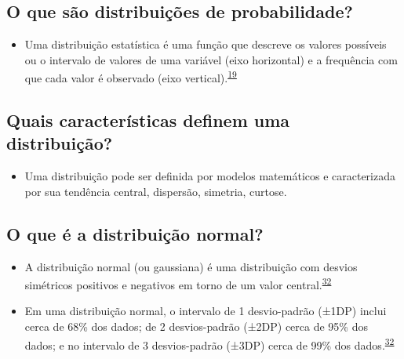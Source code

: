 \documentclass[
]{book}
\providecommand{\tightlist}{%
  \setlength{\itemsep}{0pt}\setlength{\parskip}{0pt}}
\begin{document}
\hypertarget{o-que-suxe3o-distribuiuxe7uxf5es-de-probabilidade}{%
\subsection{O que são distribuições de probabilidade?}\label{o-que-suxe3o-distribuiuxe7uxf5es-de-probabilidade}}

\begin{itemize}
\tightlist
\item
  Uma distribuição estatística é uma função que descreve os valores possíveis ou o intervalo de valores de uma variável (eixo horizontal) e a frequência com que cada valor é observado (eixo vertical).\textsuperscript{\protect\hyperlink{ref-vetter2017}{19}}
\end{itemize}

\hypertarget{quais-caracteruxedsticas-definem-uma-distribuiuxe7uxe3o}{%
\subsection{Quais características definem uma distribuição?}\label{quais-caracteruxedsticas-definem-uma-distribuiuxe7uxe3o}}

\begin{itemize}
\tightlist
\item
  Uma distribuição pode ser definida por modelos matemáticos e caracterizada por sua tendência central, dispersão, simetria, curtose.
\end{itemize}

\hypertarget{o-que-uxe9-a-distribuiuxe7uxe3o-normal}{%
\subsection{O que é a distribuição normal?}\label{o-que-uxe9-a-distribuiuxe7uxe3o-normal}}

\begin{itemize}
\item
  A distribuição normal (ou gaussiana) é uma distribuição com desvios simétricos positivos e negativos em torno de um valor central.\textsuperscript{\protect\hyperlink{ref-Ali2016}{32}}
\item
  Em uma distribuição normal, o intervalo de 1 desvio-padrão (±1DP) inclui cerca de 68\% dos dados; de 2 desvios-padrão (±2DP) cerca de 95\% dos dados; e no intervalo de 3 desvios-padrão (±3DP) cerca de 99\% dos dados.\textsuperscript{\protect\hyperlink{ref-Ali2016}{32}}
\end{itemize}
\end{document}
